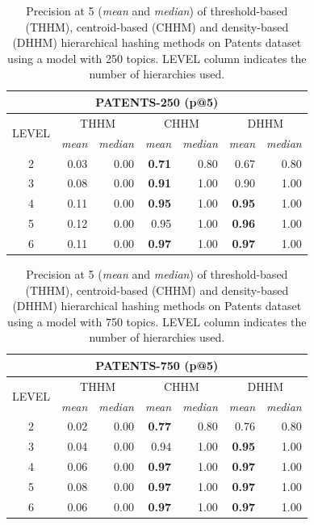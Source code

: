 \begin{table}\centering
  \scriptsize
  \begin{tabular}{c|rr||rr||rr}
    \multicolumn{7}{c}{PATENTS-250 (p@5)} \\
    \toprule
    \multirow{2}{*}{LEVEL} &
      \multicolumn{2}{c}{THHM} &
      \multicolumn{2}{c}{CHHM} &
      \multicolumn{2}{c}{DHHM} \\
      & {\textit{mean}} & {\textit{median}} & {\textit{mean}} & {\textit{median}} & {\textit{mean}} & {\textit{median}} \\
      \midrule
     2 & 0.03 & 0.00 & \textbf{0.71} & 0.80 & 0.67 & 0.80 \\
     3 & 0.08 & 0.00 & \textbf{0.91} & 1.00 & 0.90 & 1.00 \\
     4 & 0.11 & 0.00 & \textbf{0.95} & 1.00 & \textbf{0.95} & 1.00 \\
     5 & 0.12 & 0.00 & 0.95 & 1.00 & \textbf{0.96} & 1.00 \\
     6 & 0.11 & 0.00 & \textbf{0.97} & 1.00 & \textbf{0.97} & 1.00 \\
    \bottomrule
  \end{tabular}
\caption{Precision at 5 (\textit{mean} and \textit{median}) of threshold-based (THHM), centroid-based (CHHM) and density-based (DHHM) hierarchical hashing methods on Patents dataset using a model with 250 topics. LEVEL column indicates the number of hierarchies used.}
\label{tb:patents250-p}
\end{table}


\begin{table}\centering
  \scriptsize
  \begin{tabular}{c|rr||rr||rr}
    \multicolumn{7}{c}{PATENTS-750 (p@5)} \\
    \toprule
    \multirow{2}{*}{LEVEL} &
      \multicolumn{2}{c}{THHM} &
      \multicolumn{2}{c}{CHHM} &
      \multicolumn{2}{c}{DHHM} \\
      & {\textit{mean}} & {\textit{median}} & {\textit{mean}} & {\textit{median}} & {\textit{mean}} & {\textit{median}} \\
      \midrule
     2 & 0.02 & 0.00 & \textbf{0.77} & 0.80 & 0.76 & 0.80 \\
     3 & 0.04 & 0.00 & 0.94 & 1.00 & \textbf{0.95} & 1.00 \\
     4 & 0.06 & 0.00 & \textbf{0.97} & 1.00 & \textbf{0.97} & 1.00 \\
     5 & 0.08 & 0.00 & \textbf{0.97} & 1.00 & \textbf{0.97} & 1.00 \\
     6 & 0.06 & 0.00 & \textbf{0.97} & 1.00 & \textbf{0.97} & 1.00 \\
    \bottomrule
  \end{tabular}
\caption{Precision at 5 (\textit{mean} and \textit{median}) of threshold-based (THHM), centroid-based (CHHM) and density-based (DHHM) hierarchical hashing methods on Patents dataset using a model with 750 topics. LEVEL column indicates the number of hierarchies used.}
\label{tb:patents750-p}
\end{table}

